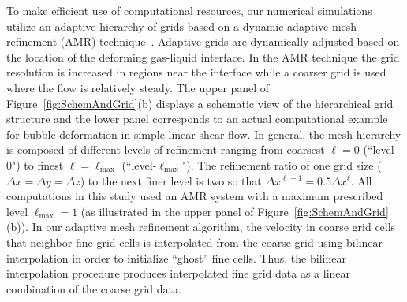 \documentclass[%
 reprint,
 showkeys,
 amsmath,amssymb,
 aps,
 prfluids,
 onecolumn
]{revtex4-2}
\begin{document}
To make efficient use of computational resources, our numerical simulations
utilize an adaptive hierarchy of grids based on a dynamic adaptive mesh
refinement (AMR) technique~\cite{SusAlmBelColHowWel99}.  Adaptive grids are
dynamically adjusted based on the location of the 
deforming gas-liquid interface.
In the AMR technique the grid resolution is increased in regions near the
interface while a coarser grid is used where the flow is relatively steady.
The upper panel of Figure~\ref{fig:SchemAndGrid}(b) displays a schematic view
of the hierarchical grid structure and the lower panel corresponds to an actual
computational example for bubble deformation in simple linear shear flow.  In
general, the mesh hierarchy is composed of different levels of refinement
ranging from coarsest $\ell=0$ (``level-0") to finest
$\ell=\ell_{\textrm{max}}$ (``level-$\ell_{\textrm{max}}$").  The refinement
ratio of one grid size ($\Delta x=\Delta y=\Delta z$) to the next finer level
is two so that $\Delta x^{\ell+1}=0.5\Delta x^{\ell}$.  All computations in
this study used an AMR system with a maximum prescribed level
$\ell_{\textrm{max}} = 1$ (as illustrated in the upper panel of
Figure~\ref{fig:SchemAndGrid}(b)).  In our adaptive mesh refinement algorithm,
the velocity in coarse grid cells that neighbor fine grid cells is interpolated
from the coarse grid using bilinear interpolation in order to initialize
``ghost'' fine cells. Thus, the bilinear interpolation procedure produces
interpolated fine grid data as a linear combination of the coarse grid data. 
\end{document}
